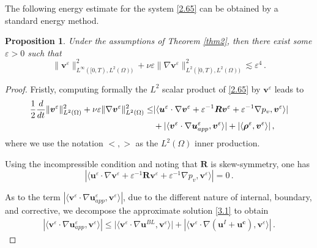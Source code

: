 \documentclass[pdflatex,sn-mathphys-num]{sn-jnl}%
\theoremstyle{thmstyleone}%
\newtheorem{proposition}[theorem]{Proposition}%
\theoremstyle{thmstyletwo}%
\theoremstyle{thmstylethree}%
\theoremstyle{thmstyletwo}
\begin{document}
The following energy estimate for the system \eqref{2.65} can be obtained by a standard energy method.
\begin{proposition}\label{prop5}
	Under the assumptions of Theorem \ref{thm2}, then there exist some $\varepsilon>0$ such that
	\begin{equation}\label{4.1}
		\lVert\boldsymbol v^{\varepsilon}\rVert^2_{L^\infty([0,T),{L}^2(\Omega))}
		+\nu\varepsilon\lVert\nabla\boldsymbol v^{\varepsilon}\rVert^2_{L^2([0,T),{L}^2(\Omega))}
		\lesssim\varepsilon^4\,.
	\end{equation} 
\end{proposition}
\begin{proof}
	Fristly, computing formally the ${L}^2$ scalar product of \eqref{2.65} by $\boldsymbol v^{\varepsilon}$ leads to
	\begin{align}\label{4.3}
		\frac{1}{2}\frac{d}{dt}\lVert\boldsymbol v^{\varepsilon}\rVert^2_{{L}^2(\Omega)}
		+\nu\varepsilon\lVert\nabla\boldsymbol v^{\varepsilon}\rVert^2_{{L}^2(\Omega)}
		\leq&|\langle{\boldsymbol u}^{\varepsilon} \cdot \nabla {\boldsymbol v}^{\varepsilon}
		+	{\varepsilon}^{-1}\boldsymbol{R}\boldsymbol v^{\varepsilon}
		+	{\varepsilon}^{-1}\nabla p_v,{\boldsymbol v}^{\varepsilon}\rangle|\notag\\
		&+|\langle
		{\boldsymbol v}^{\varepsilon} \cdot \nabla\boldsymbol{u}^\varepsilon_{app},{\boldsymbol v}^{\varepsilon}\rangle|
		+|\langle
		\boldsymbol \rho^{\varepsilon}	,{\boldsymbol v}^{\varepsilon}\rangle|\,,	
	\end{align}
	where we use the notation $<, >$ as the ${L}^2(\Omega)$ inner production.
	
	
	
	Using the incompressible condition and noting that $\boldsymbol{R}$ is skew-symmetry, one has
	\begin{equation}\label{4.4}
		|\langle{\boldsymbol u}^{\varepsilon} \cdot \nabla {\boldsymbol v}^{\varepsilon}
		+	{\varepsilon}^{-1}\boldsymbol{R}\boldsymbol v^{\varepsilon}
		+		{\varepsilon}^{-1}\nabla p_v,{\boldsymbol v}^{\varepsilon}\rangle|=0\,.	
	\end{equation}
	
	
	
	
	
	As to the term  $|\langle
	{\boldsymbol v}^{\varepsilon} \cdot \nabla\boldsymbol{u}^\varepsilon_{app},{\boldsymbol v}^{\varepsilon}\rangle|$, due to the different nature of internal, boundary, and corrective, we decompose the approximate solution \eqref{3.1} to obtain
	\begin{align*}
		|\langle
		{\boldsymbol v}^{\varepsilon} \cdot \nabla\boldsymbol{u}^\varepsilon_{app},{\boldsymbol v}^{\varepsilon}\rangle|
		\leq\big|\big\langle{\boldsymbol v}^{\varepsilon} \cdot \nabla \boldsymbol{u}^{BL}
		,{\boldsymbol v}^{\varepsilon}\big\rangle\big|
		+|\langle{\boldsymbol v}^{\varepsilon} \cdot \nabla
		(
		\boldsymbol{u}^I+
		\boldsymbol{u^c}
		),{\boldsymbol v}^{\varepsilon}\rangle|\,.
	\end{align*}
	

\end{proof}
\end{document}
